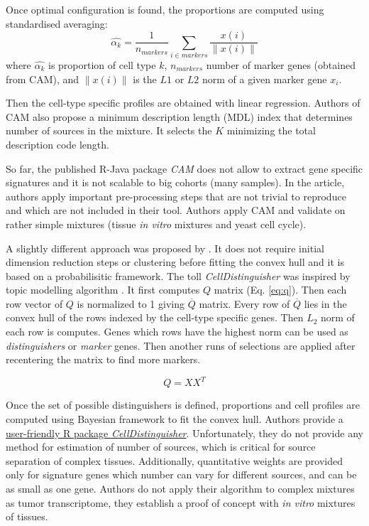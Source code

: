 \documentclass[12pt,]{book}
\theoremstyle{definition}
\theoremstyle{definition}
\theoremstyle{definition}
\theoremstyle{remark}
\begin{document}
Once optimal configuration is found, the proportions are computed using
standardised averaging: \begin{equation}
\hat{\alpha_k} = \frac{1}{n_{markers}} \sum_{i \in markers} \frac {x(i)}{\rVert x(i)\lVert}
\end{equation} where \(\hat{\alpha_k}\) is proportion of cell type
\(k\), \(n_{markers}\) number of marker genes (obtained from CAM), and
\(\rVert x(i)\lVert\) is the \(L1\) or \(L2\) norm of a given marker
gene \(x_i\).

Then the cell-type specific profiles are obtained with linear
regression. Authors of CAM also propose a minimum description length
(MDL) index that determines number of sources in the mixture. It selects
the \(K\) minimizing the total description code length.

So far, the published R-Java package \emph{CAM} does not allow to
extract gene specific signatures and it is not scalable to big cohorts
(many samples). In the article, authors apply important pre-processing
steps that are not trivial to reproduce and which are not included in
their tool. Authors apply CAM and validate on rather simple mixtures
(tissue \emph{in vitro} mixtures and yeast cell cycle).

A slightly different approach was proposed by \citet{Newberg2018}. It
does not require initial dimension reduction steps or clustering before
fitting the convex hull and it is based on a probabilisitic framework.
The toll \emph{CellDistinguisher} was inspired by topic modelling
algorithm \citep{Arora2013}. It first computes \(Q\) matrix (Eq.
\eqref{eq:q}). Then each row vector of \(Q\) is normalized to 1 giving
\(\overline{Q}\) matrix. Every row of \(\overline{Q}\) lies in the
convex hull of the rows indexed by the cell-type specific genes. Then
\(L_2\) norm of each row is computes. Genes which rows have the highest
norm can be used as \emph{distinguishers} or \emph{marker} genes. Then
another runs of selections are applied after recentering the matrix to
find more markers.

\begin{equation}
Q=XX^T \label{eq:q}
\end{equation}

Once the set of possible distinguishers is defined, proportions and cell
profiles are computed using Bayesian framework to fit the convex hull.
Authors provide a
\href{https://github.com/GeneralElectric/CellDistinguisher}{user-friendly
R package \emph{CellDistinguisher}}. Unfortunately, they do not provide
any method for estimation of number of sources, which is critical for
source separation of complex tissues. Additionally, quantitative weights
are provided only for signature genes which number can vary for
different sources, and can be as small as one gene. Authors do not apply
their algorithm to complex mixtures as tumor transcriptome, they
establish a proof of concept with \emph{in vitro} mixtures of tissues.
\end{document}
